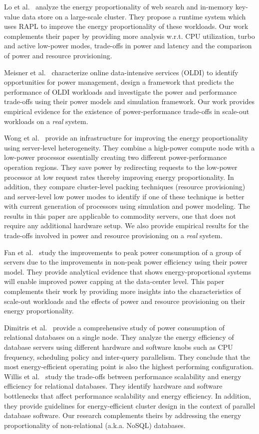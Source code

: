 \documentclass{sig-alternate}
\begin{document}
Lo et al.~\cite{pegasus} analyze the energy proportionality of web search and 
in-memory key-value data store on a large-scale cluster. They propose a runtime 
system which uses RAPL to improve the energy proportionality of these workloads.
Our work complements their paper by providing more analysis w.r.t. CPU 
utilization, turbo and active low-power modes, trade-offs in power and latency and 
the comparison of power and resource provisioning. 

Meisner et al.~\cite{oldi} characterize online data-intensive services 
(OLDI) to identify opportunities for power management, design a framework that predicts
the performance of OLDI workloads and investigate the power and
performance trade-offs using their power models and simulation framework. Our work provides 
empirical evidence for the existence of power-performance trade-offs 
in scale-out workloads on a \emph{real} system. 

Wong et al.~\cite{hpca_knightshift,knightshift} provide an infrastructure for
improving the energy proportionality using server-level
heterogeneity. They combine a high-power compute node with a low-power
processor essentially creating two different power-performance
operation regions. They save power by redirecting requests to the
low-power processor at low request rates thereby improving energy
proportionality. In addition, they compare cluster-level packing
techniques (resource provisioning) and server-level low power modes to
identify if one of these technique is better with current generation
of processors using simulation and power modeling. 
The results in this paper are applicable to commodity servers, one that does 
not require any additional hardware setup. We also provide empirical 
results for the trade-offs involved in power and resource provisioning 
on a \emph{real} system. 


Fan et al.~\cite{provisioning} study the improvements
to peak power consumption of a group of servers due to the
improvements in non-peak power efficiency using their power
model. They provide analytical evidence that shows energy-proportional
systems will enable improved power capping at the data-center
level. This paper complements their work by providing more insights into 
the characteristics of scale-out workloads and the effects of power 
and resource provisioning on their energy proportionality. 

Dimitris et al.~\cite{database_node} 
provide a comprehensive study
of power consumption of relational databases on a
single node. They analyze the energy efficiency of database servers
using different hardware and software knobs such as CPU frequency,
scheduling policy and inter-query parallelism. They conclude that the
most energy-efficient operating point is also the highest performing
configuration. Willis et al.~\cite{database_cluster} study the trade-offs
between performance scalability and energy efficiency for relational
databases.  They identify hardware and software bottlenecks that
affect performance scalability and energy efficiency. In addition,
they provide guidelines for energy-efficient cluster design in the
context of parallel database software. Our research complements
theirs by addressing the energy proportionality of
non-relational (a.k.a. NoSQL) databases.
\end{document}
